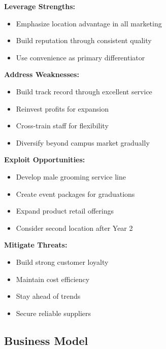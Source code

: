\documentclass[a4paper,12pt]{article}
\begin{document}
\begin{center}
\begin{tcolorbox}[mybox, title=\textbf{Strategic Implications of SWOT Analysis}, width=0.9\textwidth]
\textbf{Leverage Strengths:}
\begin{itemize}[leftmargin=1em, itemsep=2pt]
    \item Emphasize location advantage in all marketing
    \item Build reputation through consistent quality
    \item Use convenience as primary differentiator
\end{itemize}

\textbf{Address Weaknesses:}
\begin{itemize}[leftmargin=1em, itemsep=2pt]
    \item Build track record through excellent service
    \item Reinvest profits for expansion
    \item Cross-train staff for flexibility
    \item Diversify beyond campus market gradually
\end{itemize}

\textbf{Exploit Opportunities:}
\begin{itemize}[leftmargin=1em, itemsep=2pt]
    \item Develop male grooming service line
    \item Create event packages for graduations
    \item Expand product retail offerings
    \item Consider second location after Year 2
\end{itemize}

\textbf{Mitigate Threats:}
\begin{itemize}[leftmargin=1em, itemsep=2pt]
    \item Build strong customer loyalty
    \item Maintain cost efficiency
    \item Stay ahead of trends
    \item Secure reliable suppliers
\end{itemize}
\end{tcolorbox}
\end{center}

\vspace{1em}

\subsection{Business Model}
\end{document}
